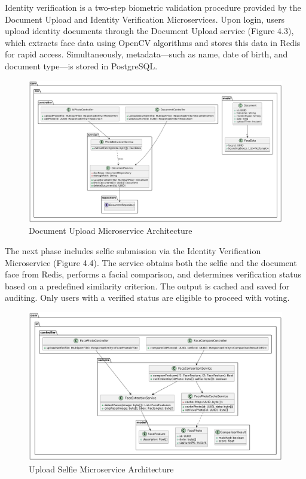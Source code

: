 \documentclass[a4paper,10pt]{report}
\begin{document}
Identity verification is a two-step biometric validation procedure provided by the Document Upload and Identity Verification Microservices.  Upon login, users upload identity documents through the Document Upload service (Figure 4.3), which extracts face data using OpenCV algorithms and stores this data in Redis for rapid access.  Simultaneously, metadata—such as name, date of birth, and document type—is stored in PostgreSQL.
\begin{figure}[htbp]
  \centering
  \includegraphics[width=1.0\textwidth]{documentUploadMicroservice.png}
  \caption{Document Upload Microservice Architecture}
  \label{fig:full}
\end{figure}

The next phase includes selfie submission via the Identity Verification Microservice (Figure 4.4).  The service obtains both the selfie and the document face from Redis, performs a facial comparison, and determines verification status based on a predefined similarity criterion.  The output is cached and saved for auditing.  Only users with a verified status are eligible to proceed with voting.
\begin{figure}[htbp]
  \centering
  \includegraphics[width=1.0\textwidth]{uploadSelfieMicroservice.png}
  \caption{Upload Selfie Microservice Architecture}
  \label{fig:full}
\end{figure}
\end{document}

